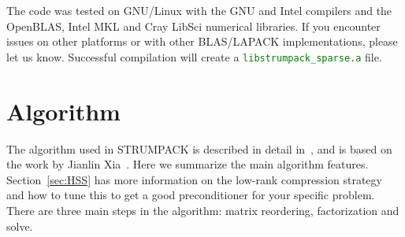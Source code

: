\documentclass{article}
\newcommand{\tm}{\textsuperscript{\textregistered}}
\begin{document}
The code was tested on GNU/Linux with the GNU and Intel\tm{} compilers
and the OpenBLAS, Intel\tm{} MKL\tm{} and Cray\tm{} LibSci\tm{}
numerical libraries. If you encounter issues on other platforms or
with other BLAS/LAPACK implementations, please let us know.
Successful compilation will create a \textcolor{green}{\texttt{libstrumpack\_sparse.a}} file.


\section{Algorithm}\label{sec:algo}
The algorithm used in STRUMPACK is described in detail
in~\cite{ghysels2015sparse}, and is based on the work by Jianlin
Xia~\cite{xia2013randomized}. Here we summarize the main algorithm
features. Section~\ref{sec:HSS} has more information on the low-rank
compression strategy and how to tune this to get a good preconditioner
for your specific problem. There are three main steps in the
algorithm: matrix reordering, factorization and solve.
\end{document}
